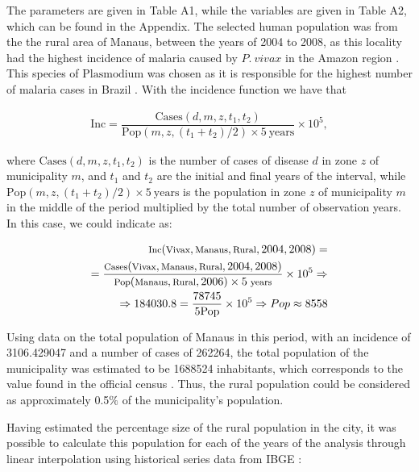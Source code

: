 \documentclass[a4paper,fleqn]{cas-dc}
\begin{document}
The parameters are given in Table A1, while the variables are given in Table A2, which can be found in the Appendix. The selected human population was from the the rural area of Manaus, between the years of 2004 to 2008, as this locality had the highest incidence of malaria caused by $P. \ vivax$ in the Amazon region \cite{Rorato2023}. This species of $\text{Plasmodium}$ was chosen as it is responsible for the highest number of malaria cases in Brazil \cite{OliveiraFerreira2010, 10.3389/fpubh.2021.647754}. With the incidence function \cite{Rorato2023} we have that

\begin{align}
\text{Inc} = %
\dfrac{\text{Cases}(d, m, z, t_1, t_2)}{\text{Pop}(m,z,(t_1+t_2)/2) \times 5 \ \text{years}} \times 10^5,
\end{align}

where $\text{Cases}(d, m, z, t_1, t_2)$ is the number of cases of disease $d$ in zone $z$ of municipality 
$m$, and $t_1$ and $t_2$ are the initial and final years of the interval, while 
$\text{Pop}(m,z,(t_1+t_2)/2) \times 5 \ \text{years}$ is the population in zone $z$ 
of municipality $m$ in the middle of the period multiplied by the total number 
of observation years. In this case, we could indicate as:

\begin{align}
    \footnotesize{\text{Inc}(\text{Vivax}, \text{Manaus}, \text{Rural}, 2004, 2008) = } \\
= \footnotesize{\dfrac{\text{Cases}(\text{Vivax}, \text{Manaus}, \text{Rural}, 2004, 2008)}{\text{Pop}(\text{Manaus}, \text{Rural}, 2006) \times 5 \ \text{years}} \times 10^5} \Rightarrow  \\
    \Rightarrow 184030.8 = \dfrac{78745}{5\text{Pop}} \times 10^5 \Rightarrow Pop \approx 8558
\end{align}

Using data on the total population of Manaus in this period, 
with an incidence of 3106.429047 and a number of cases of 262264, the 
total population of the municipality was estimated to be 1688524 
inhabitants, which corresponds to the value found in the official census \cite{Datasus2006}. Thus, the rural population could be considered as 
approximately 0.5$\%$ of the municipality's population.

Having estimated the percentage size of the rural population 
in the city, it was possible to calculate this population for 
each of the years of the analysis through linear interpolation 
using historical series data from IBGE \cite{popIBGE}:
\end{document}
